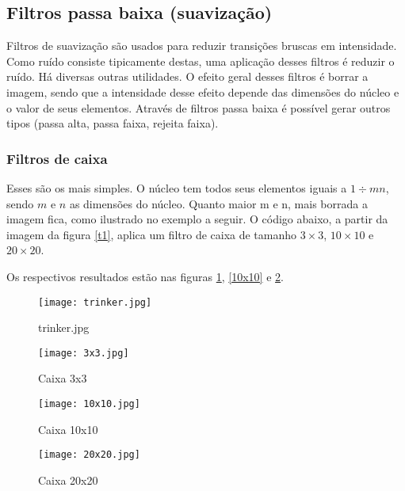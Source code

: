 \documentclass[a4paper,12pt,twoside]{article}
\begin{document}
\subsection{Filtros passa baixa (suavização)}
Filtros de suavização são usados para reduzir transições bruscas em intensidade. 
Como ruído consiste tipicamente destas, uma aplicação desses filtros é reduzir o ruído. Há diversas outras utilidades.
O efeito geral desses filtros é borrar a imagem, sendo que a intensidade desse efeito depende das dimensões do núcleo e o valor de seus elementos. 
Através de filtros passa baixa é possível gerar outros tipos (passa alta, passa faixa, rejeita faixa).
\subsubsection{Filtros de caixa}\label{boxsec}
Esses são os mais simples.
O núcleo tem todos seus elementos iguais a \(1 \div mn\), sendo \(m\) e \(n\) as dimensões do núcleo.
Quanto maior m e n, mais borrada a imagem fica, como ilustrado no exemplo a seguir.
O código abaixo, a partir da imagem da figura \ref{t1}, aplica um filtro de caixa de tamanho \(3 \times 3\), \(10 \times 10\) e \(20 \times 20\).

Os respectivos resultados estão nas figuras \ref{3x3}, \ref{10x10} e \ref{20x20}.

\begin{figure}[h]
    \centering
    \begin{minipage}{0.48\textwidth}
        \centering
  \texttt{[image: trinker.jpg]}
    \caption{trinker.jpg}\label{t1}
    \end{minipage}
    \begin{minipage}{0.48\textwidth}
        \centering
  \texttt{[image: 3x3.jpg]}
        \caption{Caixa 3x3}\label{3x3}
    \end{minipage}
\end{figure}
\begin{figure}[h!]
    \centering
    \begin{minipage}{0.48\textwidth}
        \centering
  \texttt{[image: 10x10.jpg]}
    \caption{Caixa 10x10}\label{10x10}
    \end{minipage}
    \begin{minipage}{0.48\textwidth}
        \centering
  \texttt{[image: 20x20.jpg]}
        \caption{Caixa 20x20}\label{20x20}
    \end{minipage}
\end{figure}
\newpage
\end{document}
